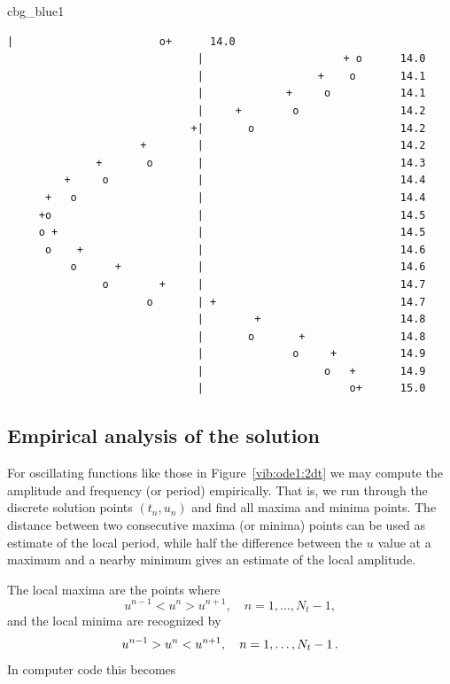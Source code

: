 \documentclass[%
oneside,                 %
final,                   %
10pt]{article}
\newenvironment{_cod_tight}[1]{
   \def\FrameCommand{\colorbox{#1}}
   \FrameRule0.6pt\MakeFramed {\FrameRestore}\vskip3mm}
   {\vskip0mm\endMakeFramed}
\newenvironment{cod}[1]{
\bgroup\rmfamily
\fboxsep=0mm\relax
\begin{_cod_tight}{#1}
\list{}{\parsep=-2mm\parskip=0mm\topsep=0pt\leftmargin=2mm
\rightmargin=2\leftmargin\leftmargin=4pt\relax}
\item\relax}
{\endlist\end{_cod_tight}\egroup}
\begin{document}
\begin{cod}{cbg_blue1}\begin{Verbatim}[numbers=none,fontsize=\fontsize{9pt}{9pt},baselinestretch=0.95,xleftmargin=2mm]
                              |                       o+      14.0
                              |                      + o      14.0
                              |                  +    o       14.1
                              |             +     o           14.1
                              |     +        o                14.2
                             +|       o                       14.2
                     +        |                               14.2
              +       o       |                               14.3
         +     o              |                               14.4
      +   o                   |                               14.4
     +o                       |                               14.5
     o +                      |                               14.5
      o    +                  |                               14.6
          o      +            |                               14.6
               o        +     |                               14.7
                      o       | +                             14.7
                              |        +                      14.8
                              |       o       +               14.8
                              |              o     +          14.9
                              |                   o   +       14.9
                              |                       o+      15.0
\end{Verbatim}
\end{cod}
\noindent


\subsection{Empirical analysis of the solution}
\label{vib:ode1:empirical}

For oscillating functions like those in Figure~\ref{vib:ode1:2dt} we may
compute the amplitude and frequency (or period) empirically.
That is, we run through the discrete solution points $(t_n, u_n)$ and
find all maxima and minima points. The distance between two consecutive
maxima (or minima) points can be used as estimate of the local period,
while half the difference between the $u$ value at a maximum and a nearby
minimum gives an estimate of the local amplitude.

The local maxima are the points where
\begin{equation}
u^{n-1} < u^n > u^{n+1},\quad n=1,\ldots,N_t-1,
\end{equation}
and the local minima are recognized by
\begin{equation}
u^{n-1} > u^n < u^{n+1},\quad n=1,\ldots,N_t-1
\tp
\end{equation}
In computer code this becomes
\end{document}
